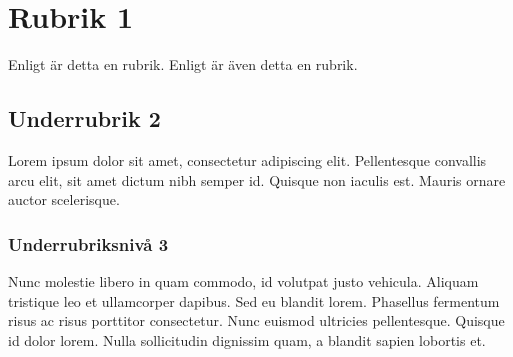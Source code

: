 \documentclass[a4paper,12pt]{article} %
\begin{document}
\section{Rubrik 1}
Enligt \cite{small} är detta en rubrik. Enligt \cite{big} är även detta en rubrik.
\subsection{Underrubrik 2}
Lorem ipsum dolor sit amet, consectetur adipiscing elit. Pellentesque convallis arcu elit, sit amet dictum nibh semper id. Quisque non iaculis est. Mauris ornare auctor scelerisque.
\subsubsection{Underrubriksnivå 3}
Nunc molestie libero in quam commodo, id volutpat justo vehicula. Aliquam tristique leo et ullamcorper dapibus. Sed eu blandit lorem. Phasellus fermentum risus ac risus porttitor consectetur. Nunc euismod ultricies pellentesque. Quisque id dolor lorem. Nulla sollicitudin dignissim quam, a blandit sapien lobortis et.
\end{document}

